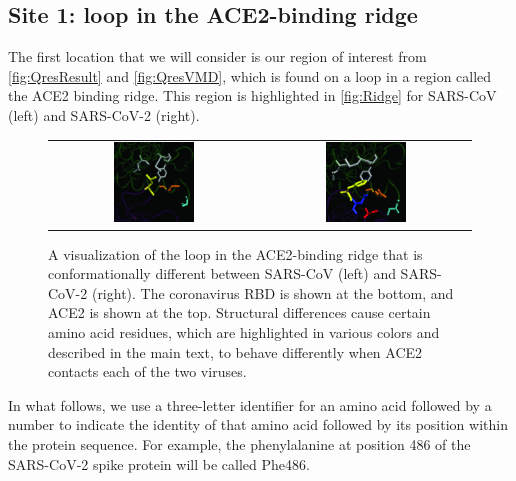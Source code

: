 \subsection{Site 1: loop in the ACE2-binding ridge}

The first location that we will consider is our region of interest from \autoref{fig:QresResult} and \autoref{fig:QresVMD}, which is found on a loop in a region called the ACE2 binding ridge. This region is highlighted in \autoref{fig:Ridge} for SARS-CoV (left) and SARS-CoV-2 (right).\\

\begin{figure}[h]
	\centering
	\mySfFamily
	\begin{tabular}{c c}
	\includegraphics[width = 0.4\textwidth]{../images_CMYK/Ridge_SARS} & \includegraphics[width = 0.4\textwidth]{../images_CMYK/Ridge_SARS-2}
	\end{tabular}
	\caption{A visualization of the loop in the ACE2-binding ridge that is conformationally different between SARS-CoV (left) and SARS-CoV-2 (right). The coronavirus RBD is shown at the bottom, and ACE2 is shown at the top. Structural differences cause certain amino acid residues, which are highlighted in various colors and described in the main text, to behave differently when ACE2 contacts each of the two viruses.}
	\label{fig:Ridge}
\end{figure}

In what follows, we use a three-letter identifier for an amino acid followed by a number to indicate the identity of that amino acid followed by its position within the protein sequence. For example, the phenylalanine at position 486 of the SARS-CoV-2 spike protein will be called Phe486.

